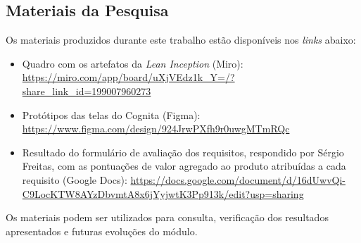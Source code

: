 
\begin{apendicesenv}

\partapendices

\chapter{Materiais da Pesquisa}
\label{ap:materiais}

Os materiais produzidos durante este trabalho estão disponíveis nos \textit{links} abaixo:

\begin{itemize}
\item Quadro com os artefatos da \textit{Lean Inception} (Miro): \url{https://miro.com/app/board/uXjVEdz1k_Y=/?share_link_id=199007960273}
\item Protótipos das telas do Cognita (Figma): \url{https://www.figma.com/design/924JrwPXfh9r0uwgMTmRQc}
\item Resultado do formulário de avaliação dos requisitos, respondido por Sérgio Freitas, com as pontuações de valor agregado ao produto atribuídas a cada requisito (Google Docs): \url{https://docs.google.com/document/d/16dUwvQi-C9LocKTW8AYzDbvmtA8x6jYyjwtK3Pp913k/edit?usp=sharing}
\end{itemize}

Os materiais podem ser utilizados para consulta, verificação dos resultados apresentados e futuras evoluções do módulo.

\end{apendicesenv}
